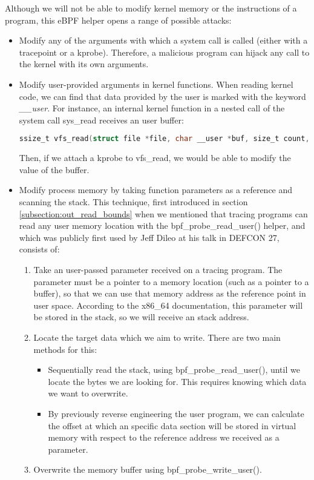Although we will not be able to modify kernel memory or the instructions of a program, this eBPF helper opens a range of possible attacks:
\begin{itemize}
\item Modify any of the arguments with which a system call is called (either with a tracepoint or a kprobe). Therefore, a malicious program can hijack any call to the kernel with its own arguments.
\item Modify user-provided arguments in kernel functions. When reading kernel code, we can find that data provided by the user is marked with the keyword \textit{\_\_user}. For instance, an internal kernel function in a nested call of the system call sys\_read receives an user buffer:
\begin{lstlisting}[language=C, caption={Definition of kernel function vfs\_read. \cite{code_vfs_read}}, label={code:vfs_read}]
ssize_t vfs_read(struct file *file, char __user *buf, size_t count, loff_t *pos)
\end{lstlisting}
Then, if we attach a kprobe to vfs\_read, we would be able to modify the value of the buffer.
\item Modify process memory by taking function parameters as a reference and scanning the stack. This technique, first introduced in section \ref{subsection:out_read_bounds} when we mentioned that tracing programs can read any user memory location with the bpf\_probe\_read\_user() helper, and which was publicly first used by Jeff Dileo at his talk in DEFCON 27\cite{evil_ebpf_p6974}, consists of:
\begin{enumerate}
\item Take an user-passed parameter received on a tracing program. The parameter must be a pointer to a memory location (such as a pointer to a buffer), so that we can use that memory address as the reference point in user space. According to the x86\_64 documentation, this parameter will be stored in the stack\cite{8664_params_abi_p1922}, so we will receive an stack address.
\item Locate the target data which we aim to write. There are two main methods for this:
\begin{itemize}
	\item Sequentially read the stack, using bpf\_probe\_read\_user(), until we locate the bytes we are looking for. This requires knowing which data we want to overwrite.
	\item By previously reverse engineering the user program, we can calculate the offset at which an specific data section will be stored in virtual memory with respect to the reference address we received as a parameter.
\end{itemize}
\item Overwrite the memory buffer using bpf\_probe\_write\_user().
\end{enumerate}
\end{itemize}

